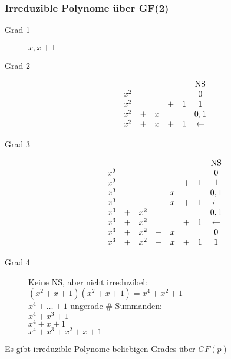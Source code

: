 \subsubsection{Irreduzible Polynome über GF(2)}
\begin{description}
	\item[Grad 1] $x, x+1$
	\item[Grad 2] 
		\[ \begin{array}{ c c c c c c }
				&	&	&	&	&\text{NS}	\\
			x^2	&	&	&	&	&0		\\
			x^2	&	&	&+	&1	&1		\\
			x^2	&+	&x	&	&	&0,1		\\
			x^2	&+	&x	&+	&1	&\leftarrow
		\end{array} \]
	\item[Grad 3] 
		\[ \begin{array}{ c c c c c c c c }
				&	&	&	&	&	&	&\text{NS}	\\
			x^3	&	&	&	&	&	&	&0		\\
			x^3	&	&	&	&	&+	&1	&1		\\
			x^3	&	&	&+	&x	&	&	&0,1		\\
			x^3	&	&	&+	&x	&+	&1	&\leftarrow\\
			x^3	&+	&x^2	&	&	&	&	&0,1		\\
			x^3	&+	&x^2	&	&	&+	&1	&\leftarrow\\
			x^3	&+	&x^2	&+	&x	&	&	&0		\\
			x^3	&+	&x^2	&+	&x	&+	&1	&1	
		\end{array} \]
	\item[Grad 4]
		Keine NS, aber nicht irreduzibel: $(x^2+x+1)(x^2+x+1) = x^4+x^2+1$ \\
		$x^4 + \dots + 1$ ungerade \# Summanden: \\
		$x^4+x^3+1$ \\
		$x^4+x+1$ \\
		$x^4+x^3+x^2+x+1$
\end{description}
Es gibt irreduzible Polynome beliebigen Grades über $GF(p)$

